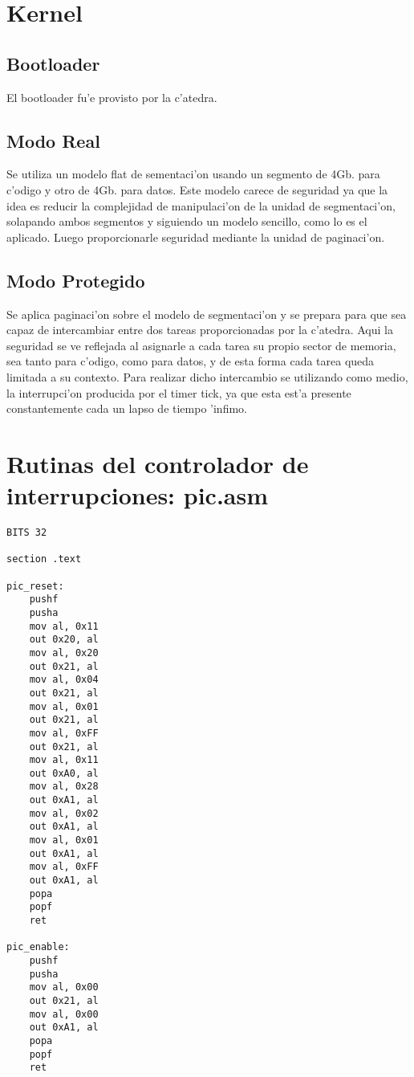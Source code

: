 \documentclass[11pt]{article}
\begin{document}
\section{Kernel}
\subsection{Bootloader} El bootloader fu'e provisto por la c'atedra.
\subsection{Modo Real}
Se utiliza un modelo flat de sementaci'on usando un segmento de 4Gb. para c'odigo y otro de 4Gb. para datos. Este modelo carece de seguridad ya que la idea es reducir la complejidad de manipulaci'on de la unidad de segmentaci'on, solapando ambos segmentos y siguiendo un modelo sencillo, como lo es el aplicado. Luego proporcionarle seguridad mediante la unidad de paginaci'on.
\subsection{Modo Protegido}
Se aplica paginaci'on sobre el modelo de segmentaci'on y se prepara para que sea capaz de intercambiar entre dos tareas proporcionadas por la c'atedra. Aqui la seguridad se ve reflejada al asignarle a cada tarea su propio sector de memoria, sea tanto para c'odigo, como para datos, y de esta forma cada tarea queda limitada a su contexto. Para realizar dicho intercambio se utilizando como medio, la interrupci'on producida por el timer tick, ya que esta est'a presente constantemente cada un lapso de tiempo 'infimo.

\newpage

\section{Rutinas del controlador de interrupciones: pic.asm}
\begin{lstlisting}[frame=single]
BITS 32

section .text

pic_reset:
	pushf
	pusha
	mov	al, 0x11
	out	0x20, al
	mov	al, 0x20
	out	0x21, al
	mov	al, 0x04
	out	0x21, al
	mov	al, 0x01
	out	0x21, al
	mov	al, 0xFF
	out	0x21, al
	mov	al, 0x11
	out	0xA0, al
	mov	al, 0x28
	out	0xA1, al
	mov	al, 0x02
	out	0xA1, al
	mov	al, 0x01
	out	0xA1, al
	mov	al, 0xFF
	out	0xA1, al
	popa
	popf
	ret

pic_enable:
	pushf
	pusha
	mov	al, 0x00
	out	0x21, al
	mov	al, 0x00
	out	0xA1, al
	popa
	popf
	ret
\end{lstlisting}
\end{document}
